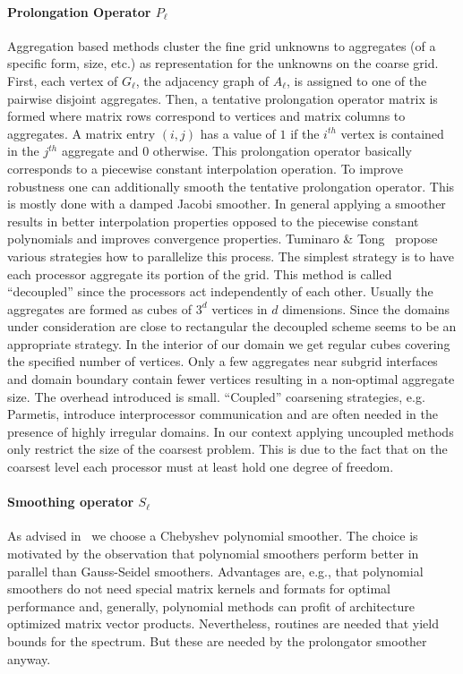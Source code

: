 \paragraph{Prolongation Operator $P_\ell$} Aggregation based methods
cluster the fine grid unknowns to aggregates (of a specific form, size,
etc.) as representation for the unknowns on the coarse grid.  First,
each vertex of $G_\ell$, the adjacency graph of $A_\ell$, is assigned to
one of the pairwise disjoint aggregates.  Then, a tentative prolongation
operator matrix is formed where matrix rows correspond to vertices and
matrix columns to aggregates.  A matrix entry $(i,j)$ has a value of $1$
if the $i^{th}$ vertex is contained in the $j^{th}$ aggregate and $0$
otherwise.  This prolongation operator basically corresponds to a
piecewise constant interpolation operation.  To improve robustness one
can additionally smooth the tentative prolongation operator. This is
mostly done with a damped Jacobi smoother.  In general applying a
smoother results in better interpolation properties opposed to the
piecewise constant polynomials and improves convergence properties.
Tuminaro \& Tong~\cite{tuto:00} propose various strategies how to
parallelize this process.  The simplest strategy is to have each
processor aggregate its portion of the grid.  This method is called
``decoupled'' since the processors act independently of each other.
Usually the aggregates are formed as cubes of $3^d$ vertices in $d$
dimensions.  Since the domains under consideration are close to
rectangular the decoupled scheme seems to be an appropriate strategy.
In the interior of our domain we get regular cubes covering the
specified number of vertices.  Only a few aggregates near subgrid
interfaces and domain boundary contain fewer vertices resulting in a
non-optimal aggregate size.  The overhead introduced is small. 
``Coupled'' coarsening strategies, e.g. Parmetis, introduce interprocessor
communication and are often needed in the presence of highly irregular
domains.  In our context applying uncoupled methods only restrict the size
of the coarsest problem.  This is due to the fact that on the coarsest
level each processor must at least hold one degree of freedom.

\paragraph{Smoothing operator $S_\ell$} As advised in~\cite{abht:03} we
choose a Chebyshev polynomial smoother.  The choice is motivated by the
observation that polynomial smoothers perform better in parallel than
Gauss-Seidel smoothers.  Advantages are, e.g., that polynomial smoothers
do not need special matrix kernels and formats for optimal performance
and, generally, polynomial methods can profit of architecture optimized
matrix vector products.  Nevertheless, routines are needed that yield
bounds for the spectrum.  But these are needed by the prolongator
smoother anyway.

